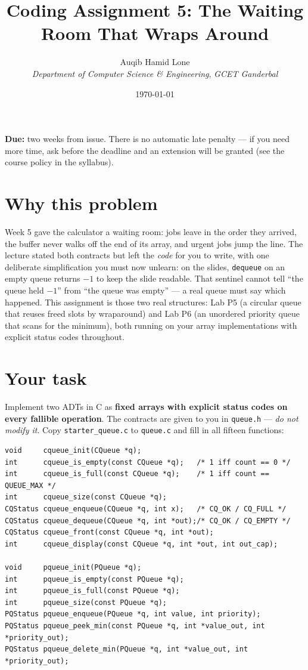\documentclass[11pt]{article}
\title{Coding Assignment 5: The Waiting Room That Wraps Around}
\author{Auqib Hamid Lone\\[0.3em]
  \emph{Department of Computer Science \& Engineering}, \emph{GCET Ganderbal}}
\date{\today}
\begin{document}
\maketitle

\noindent\textbf{Due:} two weeks from issue. There is no automatic late penalty --- if you need more time, ask before the deadline and an extension will be granted (see the course policy in the syllabus).

\section{Why this problem}

Week 5 gave the calculator a waiting room: jobs leave in the order they arrived, the buffer never walks off the end of its array, and urgent jobs jump the line. The lecture stated both contracts but left the \emph{code} for you to write, with one deliberate simplification you must now unlearn: on the slides, \texttt{dequeue} on an empty queue returns $-1$ to keep the slide readable. That sentinel cannot tell ``the queue held $-1$'' from ``the queue was empty'' --- a real queue must say which happened. This assignment is those two real structures: Lab P5 (a circular queue that reuses freed slots by wraparound) and Lab P6 (an unordered priority queue that scans for the minimum), both running on your array implementations with explicit status codes throughout.

\section{Your task}

Implement two ADTs in C as \textbf{fixed arrays with explicit status codes on every fallible operation}. The contracts are given to you in \texttt{queue.h} --- \emph{do not modify it}. Copy \texttt{starter\_queue.c} to \texttt{queue.c} and fill in all fifteen functions:

\begin{verbatim}
void     cqueue_init(CQueue *q);
int      cqueue_is_empty(const CQueue *q);   /* 1 iff count == 0 */
int      cqueue_is_full(const CQueue *q);    /* 1 iff count == QUEUE_MAX */
int      cqueue_size(const CQueue *q);
CQStatus cqueue_enqueue(CQueue *q, int x);   /* CQ_OK / CQ_FULL */
CQStatus cqueue_dequeue(CQueue *q, int *out);/* CQ_OK / CQ_EMPTY */
CQStatus cqueue_front(const CQueue *q, int *out);
int      cqueue_display(const CQueue *q, int *out, int out_cap);

void     pqueue_init(PQueue *q);
int      pqueue_is_empty(const PQueue *q);
int      pqueue_is_full(const PQueue *q);
int      pqueue_size(const PQueue *q);
PQStatus pqueue_enqueue(PQueue *q, int value, int priority);
PQStatus pqueue_peek_min(const PQueue *q, int *value_out, int *priority_out);
PQStatus pqueue_delete_min(PQueue *q, int *value_out, int *priority_out);
\end{verbatim}
\end{document}
